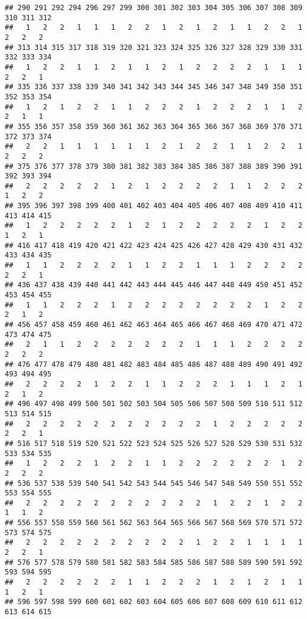 \documentclass[]{article}
\begin{document}
\begin{verbatim}
## 290 291 292 294 296 297 299 300 301 302 303 304 305 306 307 308 309 310 311 312 
##   1   2   2   1   1   1   2   2   1   2   1   2   1   1   2   2   1   2   2   2 
## 313 314 315 317 318 319 320 321 323 324 325 326 327 328 329 330 331 332 333 334 
##   1   2   2   1   1   2   1   1   2   1   2   2   2   2   1   1   1   2   2   1 
## 335 336 337 338 339 340 341 342 343 344 345 346 347 348 349 350 351 352 353 354 
##   1   2   1   2   2   1   1   2   2   2   1   2   2   2   1   1   2   2   1   1 
## 355 356 357 358 359 360 361 362 363 364 365 366 367 368 369 370 371 372 373 374 
##   2   2   1   1   1   1   1   1   2   1   2   2   1   1   2   2   1   2   2   2 
## 375 376 377 378 379 380 381 382 383 384 385 386 387 388 389 390 391 392 393 394 
##   2   2   2   2   2   1   2   1   2   2   2   2   1   1   2   2   2   1   2   2 
## 395 396 397 398 399 400 401 402 403 404 405 406 407 408 409 410 411 413 414 415 
##   1   2   2   2   2   2   1   2   1   2   2   2   2   2   1   2   2   1   2   1 
## 416 417 418 419 420 421 422 423 424 425 426 427 428 429 430 431 432 433 434 435 
##   1   1   2   2   2   2   1   1   2   2   1   1   1   2   2   2   2   2   2   1 
## 436 437 438 439 440 441 442 443 444 445 446 447 448 449 450 451 452 453 454 455 
##   1   1   2   2   2   1   2   2   2   2   2   2   2   2   1   2   2   2   1   2 
## 456 457 458 459 460 461 462 463 464 465 466 467 468 469 470 471 472 473 474 475 
##   2   1   1   2   2   2   2   2   2   2   1   1   1   2   2   2   2   2   2   2 
## 476 477 478 479 480 481 482 483 484 485 486 487 488 489 490 491 492 493 494 495 
##   2   2   2   2   1   2   2   1   1   2   2   2   1   1   1   2   1   2   1   2 
## 496 497 498 499 500 501 502 503 504 505 506 507 508 509 510 511 512 513 514 515 
##   2   2   2   2   2   2   2   2   2   2   2   1   2   2   2   2   2   2   2   1 
## 516 517 518 519 520 521 522 523 524 525 526 527 528 529 530 531 532 533 534 535 
##   1   2   2   2   1   2   2   1   1   2   2   2   2   2   2   1   2   2   2   2 
## 536 537 538 539 540 541 542 543 544 545 546 547 548 549 550 551 552 553 554 555 
##   2   2   2   2   2   2   2   2   2   2   2   1   2   2   1   2   2   1   1   2 
## 556 557 558 559 560 561 562 563 564 565 566 567 568 569 570 571 572 573 574 575 
##   2   2   2   2   2   2   2   2   2   2   1   2   2   1   1   1   1   2   2   1 
## 576 577 578 579 580 581 582 583 584 585 586 587 588 589 590 591 592 593 594 595 
##   2   2   2   2   2   2   1   1   2   2   2   1   2   1   2   1   1   1   2   1 
## 596 597 598 599 600 601 602 603 604 605 606 607 608 609 610 611 612 613 614 615 

\end{verbatim}
\end{document}
